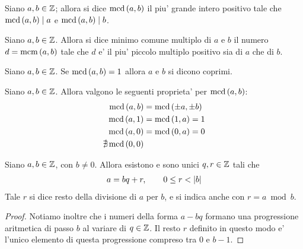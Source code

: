 \begin{definition}
    Siano $a, b \in \mathbb{Z}$; allora si dice $\operatorname{mcd}\left(a, b\right)$ il piu' grande intero positivo
    tale che $\operatorname{mcd}\left(a, b\right) \mid a$ e $\operatorname{mcd}\left(a, b\right) \mid b$.
\end{definition}

\begin{definition}
    Siano $a, b \in \mathbb{Z}$. Allora si dice minimo comune multiplo di $a$ e $b$ il numero $d = \operatorname{mcm}\left(a, b\right)$ tale che $d$ e' il piu' piccolo multiplo positivo sia di $a$ che di $b$.
\end{definition}

\begin{definition}
    Siano $a, b \in \mathbb{Z}$. Se $\operatorname{mcd}\left(a, b\right) = 1$ allora $a$ e $b$ si dicono coprimi.
\end{definition}

\begin{remark}
    Siano $a, b \in \mathbb{Z}$. Allora valgono le seguenti proprieta' per $\operatorname{mcd}\left(a, b\right)$:
    \begin{align*}
        \operatorname{mcd}\left(a, b\right) &= \operatorname{mcd}\left(\pm a, \pm b\right) \\
        \operatorname{mcd}\left(a, 1\right) &= \operatorname{mcd}\left(1, a\right) = 1 \\
        \operatorname{mcd}\left(a, 0\right) &= \operatorname{mcd}\left(0, a\right) = 0 \\
        \nexists \operatorname{mcd}\left(0, 0\right)
    \end{align*}
\end{remark}

\begin{theorem} \label{esistenza_resto}
    Siano $a, b \in \mathbb{Z}$, con $b \neq 0$. Allora esistono e sono unici $q, r \in \mathbb{Z}$ tali che
    \begin{align}
        a = bq + r, \qquad0 \leq r < \left|b\right|
    \end{align}
    Tale $r$ si dice resto della divisione di $a$ per $b$, e si indica anche con $r = a\bmod b$.
\end{theorem}
\begin{proof}
    Notiamo inoltre che i numeri della forma $a - bq$ formano una progressione aritmetica di passo $b$ al variare di $q \in \mathbb{Z}$. 
    Il resto $r$ definito in questo modo e' l'unico elemento di questa progressione compreso tra $0$ e $b - 1$.
\end{proof}

